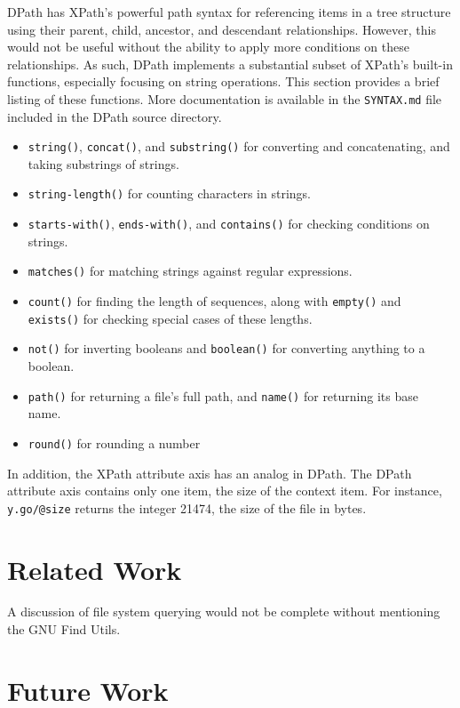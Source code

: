 \documentclass{scrartcl}
\begin{document}
DPath has XPath's powerful path syntax for referencing items in a tree structure
using their parent, child, ancestor, and descendant relationships. However, this
would not be useful without the ability to apply more conditions on these
relationships. As such, DPath implements a substantial subset of XPath's
built-in functions, especially focusing on string operations. This section
provides a brief listing of these functions. More documentation is available in
the \texttt{SYNTAX.md} file included in the DPath source directory.

\begin{itemize}
\item \texttt{string()}, \texttt{concat()}, and \texttt{substring()} for
  converting and concatenating, and taking substrings of strings.
\item \texttt{string-length()} for counting characters in strings.
\item \texttt{starts-with()}, \texttt{ends-with()}, and \texttt{contains()} for
  checking conditions on strings.
\item \texttt{matches()} for matching strings against regular expressions.
\item \texttt{count()} for finding the length of sequences, along with
  \texttt{empty()} and \texttt{exists()} for checking special cases of these
  lengths.
\item \texttt{not()} for inverting booleans and \texttt{boolean()} for
  converting anything to a boolean.
\item \texttt{path()} for returning a file's full path, and \texttt{name()} for
  returning its base name.
\item \texttt{round()} for rounding a number
\end{itemize}

In addition, the XPath attribute axis has an analog in DPath. The DPath
attribute axis contains only one item, the size of the context item. For
instance, \texttt{y.go/@size} returns the integer 21474, the size of the file in
bytes.

\section{Related Work}
\label{sec:related}

A discussion of file system querying would not be complete without mentioning
the GNU Find Utils.

\section{Future Work}
\label{sec:future}





\end{document}
